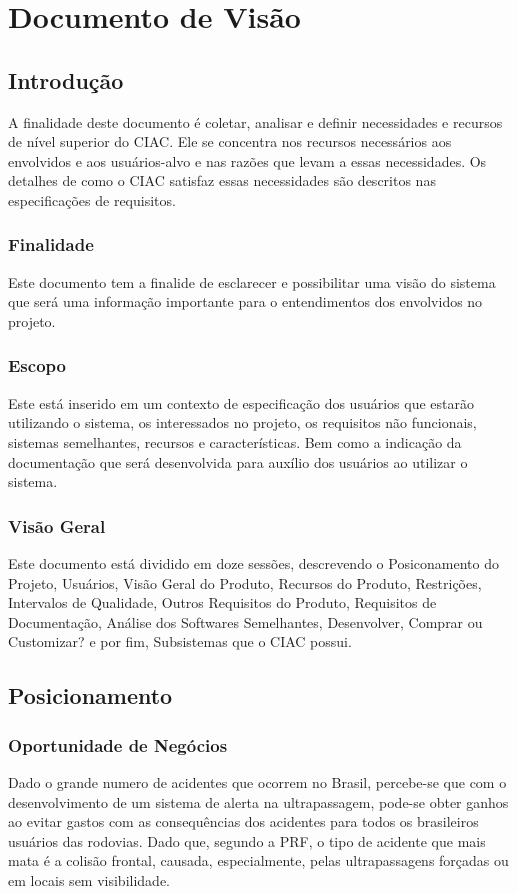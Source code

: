\chapter[Documento de Visão]{Documento de Visão}

\section{Introdução}
A finalidade deste documento é coletar, analisar e definir necessidades e recursos de nível superior do CIAC. Ele se concentra nos recursos necessários aos envolvidos e aos usuários-alvo e nas razões que levam a essas necessidades. Os detalhes de como o CIAC satisfaz essas necessidades são descritos nas especificações de requisitos.

\subsection{Finalidade}
Este documento tem a finalide de  esclarecer e possibilitar uma visão do sistema que será uma informação importante para o entendimentos dos envolvidos no projeto.
\subsection{Escopo}
Este está inserido em um contexto de especificação dos usuários que estarão utilizando o sistema, os interessados no projeto, os requisitos não funcionais, sistemas semelhantes, recursos e características. Bem como a indicação da documentação que será desenvolvida para auxílio dos usuários ao utilizar o sistema.
\subsection{Visão Geral}
Este documento está dividido em doze sessões, descrevendo o Posiconamento do Projeto, Usuários, Visão Geral do Produto, Recursos do Produto, Restrições, Intervalos de Qualidade, Outros Requisitos do Produto, Requisitos de Documentação, Análise dos Softwares Semelhantes, Desenvolver, Comprar ou Customizar? e por fim, Subsistemas que o CIAC possui.

\section{Posicionamento}

\subsection{Oportunidade de Negócios}
Dado o grande numero de acidentes que ocorrem no Brasil, percebe-se que com o
desenvolvimento de um sistema de alerta na ultrapassagem, pode-se obter
ganhos ao evitar gastos com as consequências dos acidentes para todos os
brasileiros usuários das rodovias. Dado que, segundo a PRF, o tipo de acidente
que mais mata é a colisão frontal, causada, especialmente, pelas ultrapassagens
forçadas ou em locais sem visibilidade\cite{prf}.

